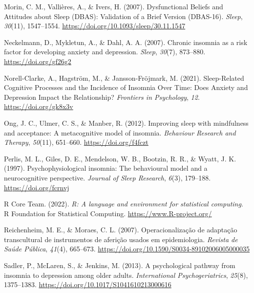 \documentclass[
  ,doc,11pt, twoside,floatsintext]{apa6}
\newlength{\cslhangindent}
\newlength{\cslentryspacingunit} %
\newenvironment{CSLReferences}[2] %
 {%
  \setlength{\parindent}{0pt}
  \ifodd #1
  \let\oldpar\par
  \def\par{\hangindent=\cslhangindent\oldpar}
  \fi
  \setlength{\parskip}{#2\cslentryspacingunit}
 }%
 {}
\begin{document}
\begin{CSLReferences}{1}{0}
\leavevmode{}%
Morin, C. M., Vallières, A., \& Ivers, H. (2007). Dysfunctional {Beliefs} and {Attitudes} about {Sleep} ({DBAS}): {Validation} of a {Brief Version} ({DBAS-16}). \emph{Sleep}, \emph{30}(11), 1547--1554. \url{https://doi.org/10.1093/sleep/30.11.1547}

\leavevmode{}%
Neckelmann, D., Mykletun, A., \& Dahl, A. A. (2007). Chronic insomnia as a risk factor for developing anxiety and depression. \emph{Sleep}, \emph{30}(7), 873--880. \url{https://doi.org/gf26g2}

\leavevmode{}%
Norell-Clarke, A., Hagström, M., \& Jansson-Fröjmark, M. (2021). Sleep-{Related Cognitive Processes} and the {Incidence} of {Insomnia Over Time}: {Does Anxiety} and {Depression Impact} the {Relationship}? \emph{Frontiers in Psychology}, \emph{12}. \url{https://doi.org/gk8x3v}

\leavevmode{}%
Ong, J. C., Ulmer, C. S., \& Manber, R. (2012). Improving sleep with mindfulness and acceptance: {A} metacognitive model of insomnia. \emph{Behaviour Research and Therapy}, \emph{50}(11), 651--660. \url{https://doi.org/f4fczt}

\leavevmode{}%
Perlis, M. L., Giles, D. E., Mendelson, W. B., Bootzin, R. R., \& Wyatt, J. K. (1997). Psychophysiological insomnia: The behavioural model and a neurocognitive perspective. \emph{Journal of Sleep Research}, \emph{6}(3), 179--188. \url{https://doi.org/fcrnvj}

\leavevmode{}%
R Core Team. (2022). \emph{R: A language and environment for statistical computing}. R Foundation for Statistical Computing. \url{https://www.R-project.org/}

\leavevmode{}%
Reichenheim, M. E., \& Moraes, C. L. (2007). {Operacionalização de adaptação transcultural de instrumentos de aferição usados em epidemiologia}. \emph{Revista de Saúde Pública}, \emph{41}(4), 665--673. \url{https://doi.org/10.1590/S0034-89102006005000035}

\leavevmode{}%
Sadler, P., McLaren, S., \& Jenkins, M. (2013). A psychological pathway from insomnia to depression among older adults. \emph{International Psychogeriatrics}, \emph{25}(8), 1375--1383. \url{https://doi.org/10.1017/S1041610213000616}


\end{CSLReferences}
\end{document}
